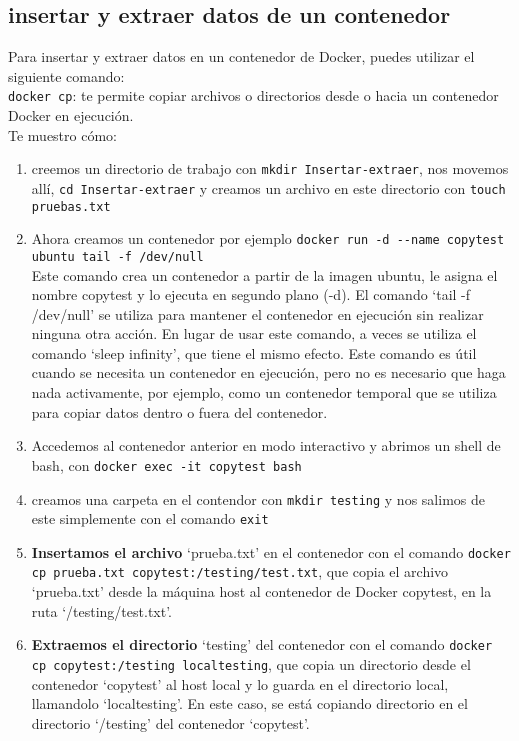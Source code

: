 \documentclass{article}
\begin{document}
\subsection{insertar y extraer datos de un contenedor}
Para insertar y extraer datos en un contenedor de Docker, puedes utilizar el siguiente comando:\\
\lstinline{docker cp}: te permite copiar archivos o directorios desde o hacia un contenedor Docker en ejecución.\\
Te muestro cómo:
\begin{enumerate}
      \item creemos un directorio de trabajo con \lstinline{mkdir Insertar-extraer}, nos movemos allí, \lstinline{cd Insertar-extraer} y creamos un archivo en este directorio con \lstinline{touch pruebas.txt}
      \item Ahora creamos un contenedor por ejemplo \lstinline{docker run -d --name copytest ubuntu tail -f /dev/null}\\
      Este comando crea un contenedor a partir de la imagen ubuntu, le asigna el nombre copytest y lo ejecuta en segundo plano (-d). El comando \enquote*{tail -f /dev/null} se utiliza para mantener el contenedor en ejecución sin realizar ninguna otra acción. En lugar de usar este comando, a veces se utiliza el comando \enquote*{sleep infinity}, que tiene el mismo efecto. Este comando es útil cuando se necesita un contenedor en ejecución, pero no es necesario que haga nada activamente, por ejemplo, como un contenedor temporal que se utiliza para copiar datos dentro o fuera del contenedor.
      \item Accedemos al contenedor anterior en modo interactivo y abrimos un shell de bash, con \lstinline{docker exec -it copytest bash}
      \item creamos una carpeta en el contendor con \lstinline{mkdir testing} y nos salimos de este simplemente con el comando \lstinline{exit}
      \item \textbf{Insertamos el archivo} \enquote*{prueba.txt} en el contenedor con el comando \lstinline{docker cp prueba.txt copytest:/testing/test.txt}, que copia el archivo \enquote*{prueba.txt} desde la máquina host al contenedor de Docker copytest, en la ruta \enquote*{/testing/test.txt}. 
      \item \textbf{Extraemos el directorio} \enquote*{testing} del contenedor con el comando \lstinline{docker cp copytest:/testing localtesting}, que copia un directorio desde el contenedor \enquote*{copytest} al host local y lo guarda en el directorio local, llamandolo \enquote*{localtesting}. En este caso, se está copiando directorio en el directorio \enquote*{/testing} del contenedor \enquote*{copytest}.
\end{enumerate}
\end{document}

